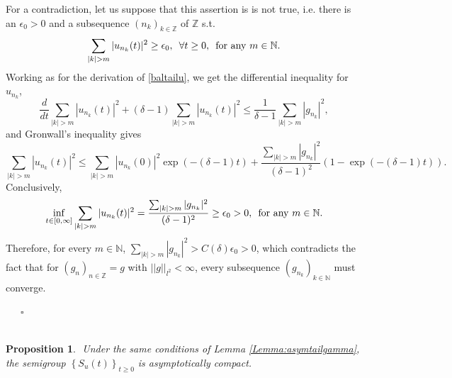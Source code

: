 \documentclass[preprintnumbers,amsmath,amssymb]{revtex4}
\newtheorem{proposition}{Proposition}[section]
\begin{document}
  For a contradiction, let us suppose that this assertion is 
is not true, 
i.e. there is an $\epsilon_0>0$ and a subsequence $(n_k)_{k \in {\mathbb{Z}}}$ of $\mathbb{Z}$ s.t.
\begin{equation}
 \sum_{|k|>m}|u_{n_k}(t)|^2 \ge \epsilon_0,\,\,\,\forall t\ge 0,\,\,\,{\rm for\,\, any}\,\, m\in {\mathbb{N}}.
\end{equation}
Working as for the derivation of \eqref{baltailu}, we get the differential inequality for $u_{n_k}$,
\begin{equation}
  \frac{d}{dt}\sum_{|k|>m}|u_{n_k}(t)|^2 +(\delta-1) \sum_{|k|>m}|u_{n_k}(t)|^2\le \frac{1}{\delta-1}  \sum_{|k|>m}|g_{n_k}|^2,
\end{equation}
and Gronwall's inequality gives
\begin{equation}
 \sum_{|k|>m}|u_{n_k}(t)|^2 \le \sum_{|k|>m}|u_{n_k}(0)|^2 \exp(-(\delta-1)t)+\frac{\sum_{|k|>m} |g_{n_k}|^2}{(\delta-1)^2}\left(1-\exp(-(\delta-1)t)\right).\label{eq:partialsum}
 \end{equation}
 Conclusively,
 \begin{equation}
  \inf_{t\in[0,\infty]}\sum_{|k|>m}|u_{n_k}(t)|^2 =
  \frac{\sum_{|k|>m} |g_{n_k}|^2}{(\delta-1)^2} \ge \epsilon_0>0,\,\,\,{\rm for\,\, any}\,\, m\in {\mathbb{N}}.
 \end{equation}
 Therefore, for every $m\in {\mathbb{N}}$, $\sum_{|k|>m}|g_{n_k}|^2>C(\delta)\epsilon_0>0$,  which contradicts the fact that for $(g_n)_{n\in {\mathbb{Z}}}=g$ with $|| g  ||_{l^2}<\infty$, every subsequence $(g_{n_k})_{k\in {\mathbb{N}}}$ must  converge. 
 
 \ \ \ $\square$
%
\\
\\
 



\begin{proposition}
{\it \,\,Under the same conditions of Lemma \ref{Lemma:asymtailgamma},  the semigroup $\left\{S_u(t)\right\}_{t\ge 0}$ is asymptotically compact.}
\label{Proposition:asymcompgamma}
\end{proposition}
\end{document}
